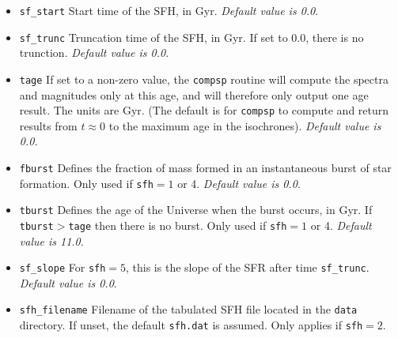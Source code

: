 \documentclass[]{article}
\begin{document}
\begin{itemize}
  is defined as the fraction of mass formed in a constant mode of SF; the range
  is therefore $0\leq C\leq1$.  Only used if \texttt{sfh}$=1$ or 4.
  {\it Default value is 0.0}.
\item{\texttt{sf\_start}} Start time of the SFH, in Gyr.
  {\it Default value is 0.0}.
\item{\texttt{sf\_trunc}} Truncation time of the SFH, in Gyr.  If set to 0.0,
  there is no trunction.
  {\it Default value is 0.0}.
\item{\texttt{tage}} If set to a non-zero value, the \texttt{compsp} routine
  will compute the spectra and magnitudes only at this age, and will therefore
  only output one age result.  The units are Gyr. (The default is for
  \texttt{compsp} to compute and return results from $t\approx0$ to the maximum
  age in the isochrones).
  {\it Default value is 0.0.}
\item{\texttt{fburst}} Defines the fraction of mass formed in an instantaneous
  burst of star formation.  Only used if \texttt{sfh}$=1$ or 4.
  {\it Default value is 0.0}.
\item{\texttt{tburst}} Defines the age of the Universe when the burst occurs, in
  Gyr.  If \texttt{tburst}$>$\texttt{tage} then there is no burst. Only used if
  \texttt{sfh}$=1$ or 4.  {\it Default value is 11.0}.
\item{\texttt{sf\_slope}} For \texttt{sfh}$=5$, this is the slope of the SFR
  after time \texttt{sf\_trunc}.
  {\it Default value is 0.0}.
\item{\texttt{sfh\_filename}} Filename of the tabulated SFH file located in the
  \texttt{data} directory.  If unset, the default \texttt{sfh.dat} is assumed.
  Only applies if \texttt{sfh}$=2$.
\end{itemize}

\vspace{0.5cm}
\end{document}
